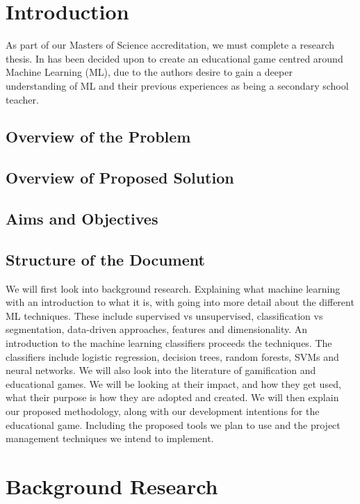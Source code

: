 \documentclass[a4paper,10pt]{article}
\begin{document}
\section{Introduction}

\small 
As part of our Masters of Science accreditation, we must complete a research thesis. In has been decided upon to create an educational game centred around Machine Learning (ML), due to the authors desire to gain a deeper understanding of ML and their previous experiences as being a secondary school teacher. 


\subsection{Overview of the Problem}

\subsection{Overview of Proposed Solution}

\subsection{Aims and Objectives}

\subsection{Structure of the Document}
We will first look into background research. Explaining what machine learning with an introduction to what it is, with going into more detail about the different ML techniques. These include supervised vs unsupervised, classification vs segmentation, data-driven approaches, features and dimensionality. An introduction to the machine learning classifiers proceeds the techniques. The classifiers include logistic regression, decision trees, random forests, SVMs and neural networks. We will also look into the literature of gamification and educational games. We will be looking at their impact, and how they get used, what their purpose is how they are adopted and created. We will then explain our proposed methodology, along with our development intentions for the educational game. Including the proposed tools we plan to use and the project management techniques we intend to implement.

\section{Background Research}
\end{document}
